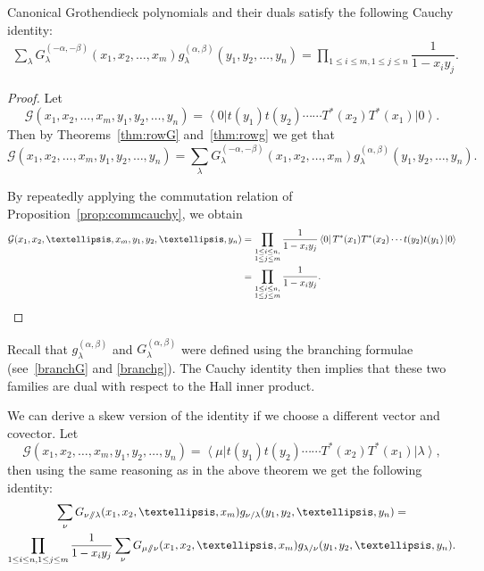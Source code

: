 \documentclass[ALCO, Unicode]{cedram}
\newcommand{\sslash}{\mathbin{/\mkern-6mu/}}
\newcommand{\bra}[1]{\left\langle #1\right|}
\newcommand{\ket}[1]{\left|#1\right\rangle}
\newcommand\g{{g^{(\alpha,\beta)}_{\lambda}}}
\newcommand\Gg{{G^{(\alpha,\beta)}_{\lambda}}}
\begin{document}
\begin{thm}
\label{cauchyidentity}
Canonical Grothendieck polynomials and their duals  satisfy the following Cauchy identity:
\begin{align}
\label{cauchyidentityeq}
    \sum_{\lambda}G^{(-\alpha,-\beta)}_{\lambda}(x_1,x_2,\dots,x_m) g^{(\alpha,\beta)}_{\lambda}(y_1,y_2,\dots,y_n)=\prod_{1\le i\le m,1\le j\le n} \dfrac{1}{1-x_i y_j}.
 \end{align}
\end{thm}
\begin{proof}
Let 
\[
\mathcal{G}(x_1,x_2,\dots, x_m,y_1,y_2,\dots,y_n)= \bra{0}{t}(y_1){t}(y_2)\cdots \cdots {T^{*}}(x_2) {T^{*}}(x_1)\ket{0}.
\] 
Then by Theorems~\ref{thm:rowG} and~\ref{thm:rowg} we get that
\[
\mathcal{G}(x_1,x_2,\dots,x_m,y_1,y_2,\dots,y_n)=  \sum_{\lambda}G^{(-\alpha,-\beta)}_{\lambda}(x_1,x_2,\dots,x_m) g^{(\alpha,\beta)}_{\lambda}(y_1,y_2,\dots,y_n).
\]


By repeatedly applying the commutation relation of Proposition~\ref{prop:commcauchy}, we obtain
\begin{align*}
    \mathcal{G}(x_1,x_2,\dots,x_m,y_1,y_2,\dots,y_n)&= \prod_{\substack{1\le i\le n,\\
    1 \le j\le m}} \dfrac{1}{1-x_i y_j} \bra{0}{T^{*}}(x_1) {T^{*}}(x_2)\cdots {t}(y_2){t}(y_1)\ket{0}\\
&=  \prod_{\substack{1\le i\le n,\\
    1 \le j\le m}}\dfrac{1}{1-x_i y_j}.\qedhere
\end{align*}
\end{proof}

\begin{rema}
Recall that $\g$ and $\Gg$ were defined using the branching formulae (see~\eqref{branchG} and \eqref{branchg}). The Cauchy identity then implies that these two families are dual with respect to the Hall inner product.
\end{rema}



We can derive a skew version of the identity if we choose a different vector and covector. Let
\[
\mathcal{G}(x_1,x_2,\dots, x_m,y_1,y_2,\dots,y_n)= \bra{\mu}{t}(y_1){t}(y_2)\cdots \cdots {T^{*}}(x_2) {T^{*}}(x_1)\ket{\lambda},
\]
then using the same reasoning as in the above theorem we get the following identity:
\begin{multline*}
\sum_{\nu}G_{\nu\sslash \lambda}(x_1,x_2,\dots, x_m)g_{\nu/\lambda}(y_1,y_2,\dots,y_n)=\\
\prod_{1\le i\le n,1\le j\le m} \dfrac{1}{1-x_i y_j}
\sum_{\nu}G_{\mu\sslash \nu}(x_1,x_2,\dots, x_m)g_{\lambda/\nu}(y_1,y_2,\dots,y_n).
\end{multline*}
\end{document}
